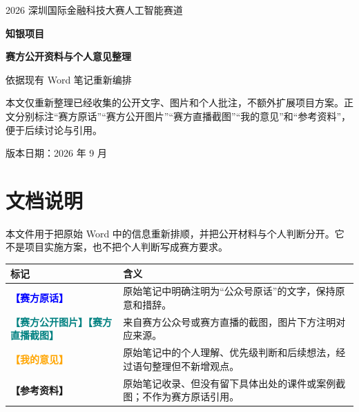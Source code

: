 \documentclass[UTF8,11pt,a4paper,fontset=fandol]{ctexart}
\newcommand{\officialtag}{\textcolor{Blue}{\bfseries【赛方原话】}}
\newcommand{\figuretag}{\textcolor{Teal}{\bfseries【赛方公开图片】}}
\newcommand{\livetag}{\textcolor{Teal}{\bfseries【赛方直播截图】}}
\newcommand{\mytag}{\textcolor{Orange}{\bfseries【我的意见】}}
\newcommand{\referencetag}{\textcolor{Muted}{\bfseries【参考资料】}}
\begin{document}
\begin{titlepage}
  \pagecolor{Navy}\color{white}
  \vspace*{2.1cm}
  {\large\color{Teal}2026 深圳国际金融科技大赛人工智能赛道\par}
  \vspace{1.2cm}
  {\fontsize{30}{42}\selectfont\bfseries 知银项目\par}
  \vspace{0.35cm}
  {\fontsize{25}{36}\selectfont\bfseries 赛方公开资料与个人意见整理\par}
  \vspace{1.0cm}
  {\large 依据现有 Word 笔记重新编排\par}
  \vfill
  \begin{minipage}{0.90\textwidth}\color{white!86}\sloppy
    本文仅重新整理已经收集的公开文字、图片和个人批注，不额外扩展项目方案。正文分别标注“赛方原话”“赛方公开图片”“赛方直播截图”“我的意见”和“参考资料”，便于后续讨论与引用。
  \end{minipage}
  \vspace{1.5cm}
  {\small 版本日期：2026 年 9 月\par}
\end{titlepage}
\pagecolor{white}\color{black}

\section*{文档说明}
本文件用于把原始 Word 中的信息重新排顺，并把公开材料与个人判断分开。它不是项目实施方案，也不把个人判断写成赛方要求。

\noindent\begin{tabularx}{\textwidth}{>{\bfseries}p{4.8cm} X}
\toprule
标记 & 含义 \\
\midrule
\officialtag & 原始笔记中明确注明为“公众号原话”的文字，保持原意和措辞。\\
\figuretag\newline\livetag & 来自赛方公众号或赛方直播的截图，图片下方注明对应来源。\\
\mytag & 原始笔记中的个人理解、优先级判断和后续想法，经过语句整理但不新增观点。\\
\referencetag & 原始笔记收录、但没有留下具体出处的课件或案例截图；不作为赛方原话引用。\\
\bottomrule
\end{tabularx}

\vspace{0.8em}
{\small\tableofcontents}
\clearpage
\end{document}
